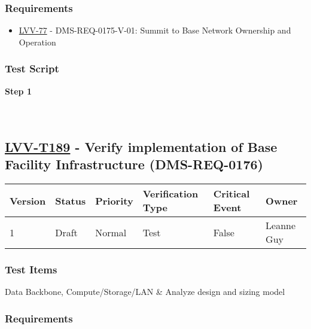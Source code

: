 \hypertarget{requirements-165}{%
\subsubsection{Requirements}\label{requirements-165}}

\begin{itemize}
\tightlist
\item
  \href{https://jira.lsstcorp.org/browse/LVV-77}{LVV-77} -
  DMS-REQ-0175-V-01: Summit to Base Network Ownership and Operation
\end{itemize}

\hypertarget{test-script-165}{%
\subsubsection{Test Script}\label{test-script-165}}

\textbf{Step 1}\\
~\\
~\\

\hypertarget{lvv-t189---verify-implementation-of-base-facility-infrastructure-dms-req-0176}{%
\subsection{\texorpdfstring{\href{https://jira.lsstcorp.org/secure/Tests.jspa\#/testCase/LVV-T189}{LVV-T189}
- Verify implementation of Base Facility Infrastructure
(DMS-REQ-0176)}{LVV-T189 - Verify implementation of Base Facility Infrastructure (DMS-REQ-0176)}}\label{lvv-t189---verify-implementation-of-base-facility-infrastructure-dms-req-0176}}

\begin{longtable}[]{@{}llllll@{}}
\toprule
Version & Status & Priority & Verification Type & Critical Event &
Owner\tabularnewline
\midrule
\endhead
1 & Draft & Normal & Test & False & Leanne Guy\tabularnewline
\bottomrule
\end{longtable}

\hypertarget{test-items-165}{%
\subsubsection{Test Items}\label{test-items-165}}

Data Backbone, Compute/Storage/LAN \& Analyze design and sizing model

\hypertarget{requirements-166}{%
\subsubsection{Requirements}\label{requirements-166}}

